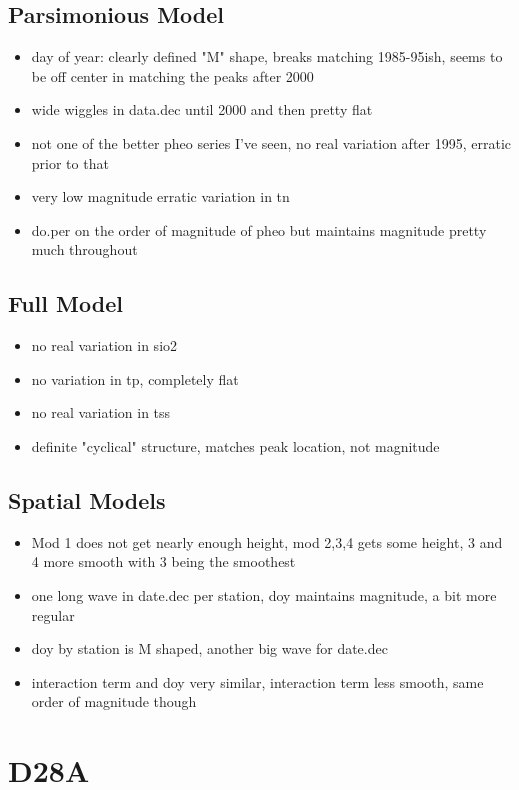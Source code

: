 \documentclass[12pt]{amsart}
\begin{document}
\subsection{Parsimonious Model}
\begin{itemize}
\item day of year: clearly defined "M" shape, breaks matching 1985-95ish, seems to be off center in matching the peaks after 2000
\item wide wiggles in data.dec until 2000 and then pretty flat
\item not one of the better pheo series I've seen, no real variation after 1995, erratic prior to that
\item very low magnitude erratic variation in tn
\item do.per on the order of magnitude of pheo but maintains magnitude pretty much throughout
\end{itemize}
\subsection{Full Model}
\begin{itemize}
\item no real variation in sio2
\item no variation in tp, completely flat
\item no real variation in tss
\item definite "cyclical" structure, matches peak location, not magnitude
\end{itemize}

\subsection{Spatial Models}
\begin{itemize}
\item Mod 1 does not get nearly enough height, mod 2,3,4 gets some height, 3 and 4 more smooth with 3 being the smoothest
\item one long wave in date.dec per station, doy maintains magnitude, a bit more regular
\item doy by station is M shaped, another big wave for date.dec
\item interaction term and doy very similar, interaction term less smooth, same order of magnitude though
\end{itemize}

\section{D28A}
\end{document}
